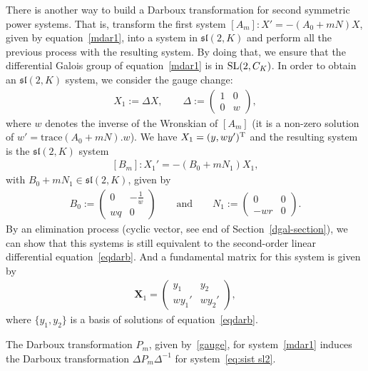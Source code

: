 \documentclass[pdftex]{sigma}%
\numberwithin{equation}{section}
\begin{document}
There is another way to build a Darboux transformation for second symmetric power systems. That is, transform the first system $[A_m]\colon X'=-(A_0+mN) X$, given by equation~\eqref{mdar1}, into a system in $\mathfrak{sl} (2,K)$ and perform all the previous process with the resulting system. By doing that, we ensure that the differential Galois group of equation~\eqref{mdar1}
is in ${\rm SL}(2, C_K)$.
In order to obtain an $\mathfrak{sl} (2,K)$ system, we consider the gauge change:
\begin{gather} \label{eq:gauge sl2}
X_{1}:=\Delta X , \qquad
\Delta:= \begin{pmatrix} 1&0 \\ 0 & w \end{pmatrix}\!,
\end{gather}
where $w$ denotes the inverse of the Wronskian of $[A_m]$
(it is a non-zero solution of $w'=\textrm{trace}(A_0+mN).w$). We have
$X_{1} = (y, {w}y')^{\rm T} $ and the resulting system is the $\mathfrak{sl} (2,K)$ system
\begin{gather}\label{eq:sist sl2}
 [B_{m}]\colon X_{1}'=-(B_0+mN_1) X_{1} ,
\end{gather}
with $B_0 + mN_1 \in \mathfrak{sl}(2,K)$, given by
\begin{gather*}
B_0:= \begin{pmatrix} 0& - \frac{1}{w}\\ wq&0 \end{pmatrix} \qquad \text{and} \qquad
N_1:= \begin{pmatrix} 0&0\\ -wr&0 \end{pmatrix}\!.
\end{gather*}
By an elimination process (cyclic vector, see end of Section~\ref{dgal-section}), we can show that this systems is still equivalent to the second-order linear differential equation~\eqref{eqdarb}.
And a fundamental matrix for this system is given by
\begin{gather}\label{eq:sol-fund-gaug-2}
 \mathbf{X}_{1} = \begin{pmatrix} y_1 & y_2 \\ wy_1' & w y_2' \end{pmatrix}\!,
\end{gather}
where $\{ y_1, y_2 \}$ is a basis of solutions of equation~\eqref{eqdarb}.

The Darboux transformation $P_m$, given by~\eqref{gauge}, for system~\eqref{mdar1} induces the Darboux transformation $\Delta P_m \Delta^{-1}$ for system~\eqref{eq:sist sl2}.
\end{document}
